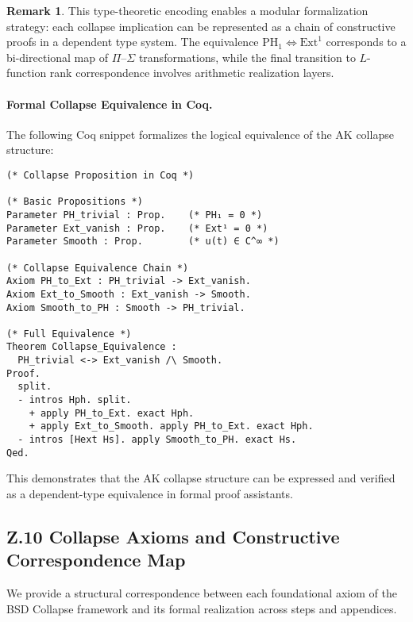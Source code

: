 \documentclass[11pt]{article}
\theoremstyle{definition}
\newtheorem{remark}[theorem]{Remark}
\begin{document}
\begin{remark}
This type-theoretic encoding enables a modular formalization strategy: each collapse implication can be represented as a chain of constructive proofs in a dependent type system.  
The equivalence \( \mathrm{PH}_1 \Longleftrightarrow \mathrm{Ext}^1 \) corresponds to a bi-directional map of $\Pi$–$\Sigma$ transformations, while the final transition to $L$-function rank correspondence involves arithmetic realization layers.
\end{remark}

\paragraph{Formal Collapse Equivalence in Coq.}

The following Coq snippet formalizes the logical equivalence of the AK collapse structure:

\begin{lstlisting}[language=Coq, caption=Collapse Structure in Coq Type Theory]
(* Collapse Proposition in Coq *)

(* Basic Propositions *)
Parameter PH_trivial : Prop.    (* PH₁ = 0 *)
Parameter Ext_vanish : Prop.    (* Ext¹ = 0 *)
Parameter Smooth : Prop.        (* u(t) ∈ C^∞ *)

(* Collapse Equivalence Chain *)
Axiom PH_to_Ext : PH_trivial -> Ext_vanish.
Axiom Ext_to_Smooth : Ext_vanish -> Smooth.
Axiom Smooth_to_PH : Smooth -> PH_trivial.

(* Full Equivalence *)
Theorem Collapse_Equivalence :
  PH_trivial <-> Ext_vanish /\ Smooth.
Proof.
  split.
  - intros Hph. split.
    + apply PH_to_Ext. exact Hph.
    + apply Ext_to_Smooth. apply PH_to_Ext. exact Hph.
  - intros [Hext Hs]. apply Smooth_to_PH. exact Hs.
Qed.
\end{lstlisting}

This demonstrates that the AK collapse structure  
can be expressed and verified as a dependent-type equivalence in formal proof assistants.




\subsection*{Z.10 Collapse Axioms and Constructive Correspondence Map}

We provide a structural correspondence between each foundational axiom  
of the BSD Collapse framework and its formal realization across steps and appendices.
\end{document}
